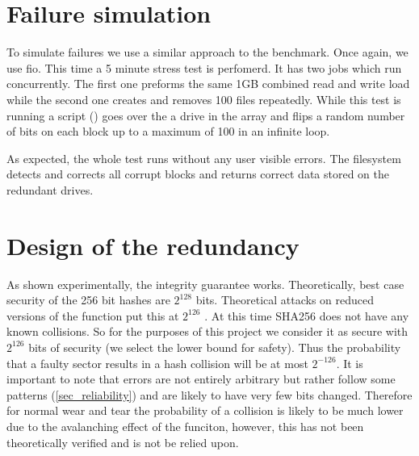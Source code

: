 

    \section{Failure simulation}

        To simulate failures we use a similar approach to the benchmark. Once
        again, we use fio. This time a 5 minute stress test is perfomerd. It
        has two jobs which run concurrently. The first one preforms the same
        1GB combined read and write load while the second one creates and
        removes 100 files repeatedly. While this test is running a script
        () goes over the a drive in the array
        and flips a random number of bits on each block up to a maximum of 100
        in an infinite loop.

        As expected, the whole test runs without any user visible errors. The
        filesystem detects and corrects all corrupt blocks and returns correct
        data stored on the redundant drives.


    \section{Design of the redundancy}

        As shown experimentally, the integrity guarantee works. Theoretically,
        best case security of the 256 bit hashes are $2^{128}$ bits.
        Theoretical attacks on reduced versions of the function put this at
        $2^{126}$ \cite{sha2_security} \cite{sha2_analysis}. At this time
        SHA256 does not have any known collisions. So for the purposes of this
        project we consider it as secure with $2^{126}$ bits of security (we
        select the lower bound for safety). Thus the probability that a faulty
        sector results in a hash collision will be at most $2^{-126}$. It is
        important to note that errors are not entirely arbitrary but rather
        follow some patterns (\ref{sec_reliability}) and are likely to have
        very few bits changed. Therefore for normal wear and tear the
        probability of a collision is likely to be much lower due to the
        avalanching effect of the funciton, however, this has not been
        theoretically verified and is not be relied upon.

